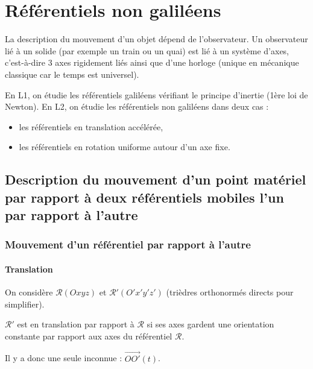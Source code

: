 \chapter{Référentiels non galiléens}

La description du mouvement d'un objet dépend de l'observateur. Un observateur lié à un solide (par exemple un train ou un quai) est lié à un système d'axes, c'est-à-dire 3 axes rigidement liés ainsi que d'une horloge (unique en mécanique classique car le temps est universel).

En L1, on étudie les référentiels galiléens vérifiant le principe d'inertie (1ère loi de Newton). En L2, on étudie les référentiels non galiléens dans deux cas :
\begin{itemize}
    \item les référentiels en translation accélérée,
    \item les référentiels en rotation uniforme autour d'un axe fixe.
\end{itemize}

\minitoc 

\section[Description du mouvement d'un point matériel]{Description du mouvement d'un point matériel par rapport à deux référentiels mobiles l'un par rapport à l'autre}

    \subsection{Mouvement d'un référentiel par rapport à l'autre}

        \subsubsection{Translation}

            On considère $\mathcal{R}(Oxyz)$ et $\mathcal{R}'(O'x'y'z')$ (trièdres orthonormés directs pour simplifier).

            \begin{definition}
                $\mathcal{R}'$ est en translation par rapport à $\mathcal{R}$ si ses axes gardent une orientation constante par rapport aux axes du référentiel $\mathcal{R}$.
            \end{definition}

            Il y a donc une seule inconnue : $\vec{OO'}(t)$.


